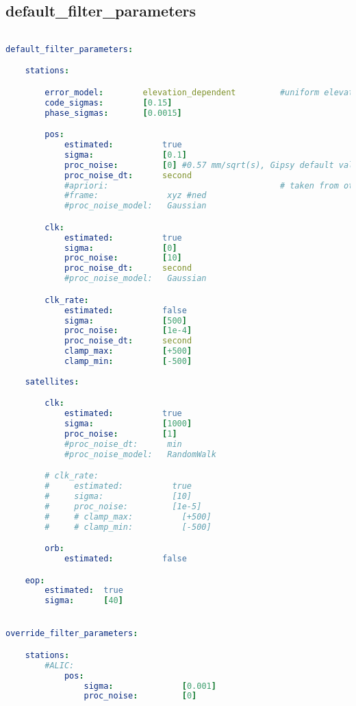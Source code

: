\subsection{default\_filter\_parameters}

\begin{lstlisting}[language=yaml,caption=Filter Parameters:]

default_filter_parameters:

    stations:

        error_model:        elevation_dependent         #uniform elevation_dependent
        code_sigmas:        [0.15]
        phase_sigmas:       [0.0015]

        pos:
            estimated:          true
            sigma:              [0.1]
            proc_noise:         [0] #0.57 mm/sqrt(s), Gipsy default value from slow-moving
            proc_noise_dt:      second
            #apriori:                                   # taken from other source, rinex file etc.
            #frame:              xyz #ned
            #proc_noise_model:   Gaussian

        clk:
            estimated:          true
            sigma:              [0]
            proc_noise:         [10]
            proc_noise_dt:      second
            #proc_noise_model:   Gaussian

        clk_rate:
            estimated:          false
            sigma:              [500]
            proc_noise:         [1e-4]
            proc_noise_dt:      second
            clamp_max:          [+500]
            clamp_min:          [-500]
            
    satellites:

        clk:
            estimated:          true
            sigma:              [1000]
            proc_noise:         [1]
            #proc_noise_dt:      min
            #proc_noise_model:   RandomWalk

        # clk_rate:
        #     estimated:          true
        #     sigma:              [10]
        #     proc_noise:         [1e-5]
        #     # clamp_max:          [+500]
        #     # clamp_min:          [-500]

        orb:
            estimated:          false

    eop:
        estimated:  true
        sigma:      [40]


override_filter_parameters:

    stations:
        #ALIC:
            pos:
                sigma:              [0.001]
                proc_noise:         [0]
\end{lstlisting}


